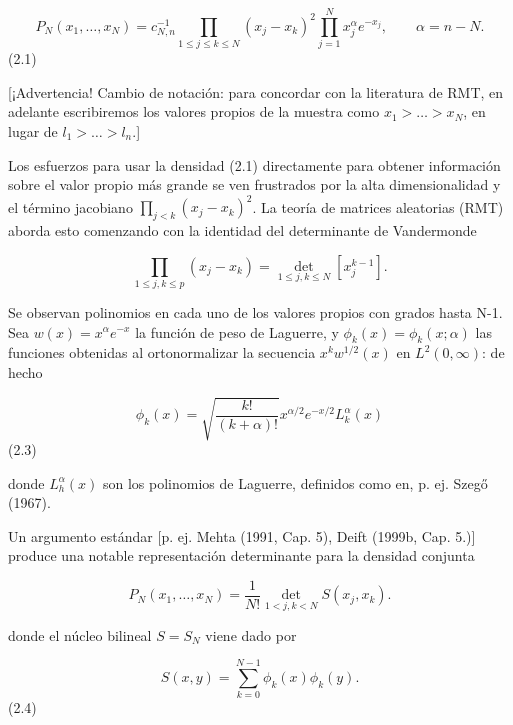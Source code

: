 \documentclass[11pt,a4paper]{article}
\begin{document}
$$P_N(x_1, \dots, x_N) = c_{N,n}^{-1} \prod_{1 \le j \le k \le N} (x_j - x_k)^2 \prod_{j=1}^N x_j^{\alpha} e^{-x_j}, \qquad \alpha = n - N.$$
 (2.1)

[¡Advertencia! Cambio de notación: para concordar con la literatura de RMT, en adelante escribiremos los valores propios de la muestra como $x_1 > \ldots > x_N$, en lugar de $l_1 > \ldots > l_n$.]

Los esfuerzos para usar la densidad (2.1) directamente para obtener información sobre el valor propio más grande se ven frustrados por la alta dimensionalidad y el término jacobiano $\prod_{j < k} (x_j - x_k)^2$. La teoría de matrices aleatorias (RMT) aborda esto comenzando con la identidad del determinante de Vandermonde

$$\prod_{1 \le j,k \le p} (x_j - x_k) = \det_{1 \le j,k \le N} [x_j^{k-1}]. \tag{2.2}$$

Se observan polinomios en cada uno de los valores propios con grados hasta N-1. Sea $w(x) = x^{\alpha}e^{-x}$ la función de peso de Laguerre, y $\phi_k(x) = \phi_k(x;\alpha)$ las funciones obtenidas al ortonormalizar la secuencia $x^k w^{1/2}(x)$ en $L^2(0,\infty)$: de hecho

$$\phi_k(x) = \sqrt{\frac{k!}{(k+\alpha)!}} x^{\alpha/2} e^{-x/2} L_k^{\alpha}(x)$$
 (2.3)

donde $L_h^{\alpha}(x)$ son los polinomios de Laguerre, definidos como en, p. ej. Szegő (1967).

Un argumento estándar [p. ej. Mehta (1991, Cap. 5), Deift (1999b, Cap. 5.)] produce una notable representación determinante para la densidad conjunta

$$P_N(x_1, \dots, x_N) = \frac{1}{N!} \det_{1 < j,k < N} S(x_j, x_k).$$

donde el núcleo bilineal $S = S_N$ viene dado por

$$S(x,y) = \sum_{k=0}^{N-1} \phi_k(x)\phi_k(y).$$
 (2.4)
\end{document}
